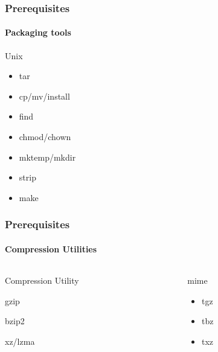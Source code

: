 \documentclass[12pt,hyperref={pdfpagelabels=true}]{beamer}
\begin{document}
\begin{frame}
  \frametitle{Prerequisites}
  \framesubtitle{Packaging tools}
  \begin{block}{Unix}
    \begin{itemize}[<+-| alert@+>]
    \item tar
    \item cp/mv/install
    \item find
    \item chmod/chown
    \item mktemp/mkdir
    \item strip
    \item make
    \end{itemize}
  \end{block}
\end{frame}

\begin{frame}
  \frametitle{Prerequisites}
  \framesubtitle{Compression Utilities}
  \begin{columns}
    \begin{column}{4cm}
      \begin{block}{Compression Utility}
        \begin{description}
        \item<1-> gzip
        \item<2-> bzip2
        \item<3-> xz/lzma
        \end{description}
      \end{block}
    \end{column}

    \begin{column}{4cm}
      \begin{block}{mime}
        \begin{itemize}
        \item<1-> tgz
        \item<2-> tbz
        \item<3-> txz
        \end{itemize}
      \end{block}
    \end{column}
  \end{columns}
\end{frame}
\end{document}
